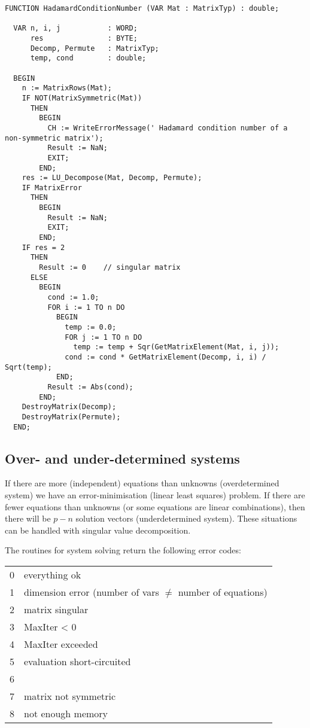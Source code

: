 \begin{lstlisting}[caption=Condition Number]
  FUNCTION HadamardConditionNumber (VAR Mat : MatrixTyp) : double;

  VAR n, i, j           : WORD;
      res               : BYTE;
      Decomp, Permute   : MatrixTyp;
      temp, cond        : double;

  BEGIN
    n := MatrixRows(Mat);
    IF NOT(MatrixSymmetric(Mat))
      THEN
        BEGIN
          CH := WriteErrorMessage(' Hadamard condition number of a non-symmetric matrix');
          Result := NaN;
          EXIT;
        END;
    res := LU_Decompose(Mat, Decomp, Permute);
    IF MatrixError
      THEN
        BEGIN
          Result := NaN;
          EXIT;
        END;
    IF res = 2
      THEN
        Result := 0    // singular matrix
      ELSE
        BEGIN
          cond := 1.0;
          FOR i := 1 TO n DO
            BEGIN
              temp := 0.0;
              FOR j := 1 TO n DO
                temp := temp + Sqr(GetMatrixElement(Mat, i, j));
              cond := cond * GetMatrixElement(Decomp, i, i) / Sqrt(temp);
            END;
          Result := Abs(cond);
        END;
    DestroyMatrix(Decomp);
    DestroyMatrix(Permute);
  END;
\end{lstlisting}

\subsection{Over- and under-determined systems}

If there are more (independent) equations  than unknowns  (overdetermined system) we have an error-minimisation (linear least squares) problem. If there are fewer equations than unknowns (or some equations are linear combinations), then there will be \(p-n \) solution vectors (underdetermined system). These situations can be handled with singular value decomposition.

The routines for system solving return the following error codes:

\begin{tabular}{ll}
  0 & everything ok \\
  1 & dimension error (number of vars \(\neq \) number of equations) \\
  2 & matrix singular \\
  3 & MaxIter < 0 \\
  4 & MaxIter exceeded \\
  5 & evaluation short-circuited  \\
  6 &  \\
  7 & matrix not symmetric \\
  8 & not enough memory \\
\end{tabular}

